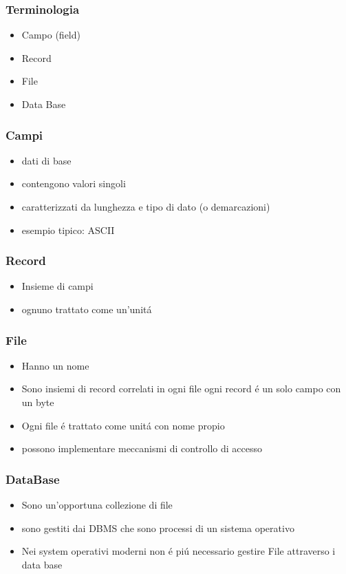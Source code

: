 \subsubsection*{Terminologia}
\begin{itemize}
    \item Campo (field)
    \item Record
    \item File
    \item Data Base
\end{itemize}
\subsubsection*{Campi}
\begin{itemize}
    \item dati di base
    \item contengono valori singoli
    \item caratterizzati da lunghezza e tipo di dato (o demarcazioni)
    \item esempio tipico: ASCII
\end{itemize}
\subsubsection*{Record}
\begin{itemize}
    \item Insieme di campi
    \item ognuno trattato come un'unitá
\end{itemize}
\subsubsection*{File}
\begin{itemize}
    \item Hanno un nome
    \item Sono insiemi di record correlati in ogni file ogni record é un solo campo con un byte
    \item Ogni file é trattato come unitá con nome propio
    \item possono implementare meccanismi di controllo di accesso
\end{itemize}
\subsubsection*{DataBase}
\begin{itemize}
    \item Sono un'opportuna collezione di file
    \item sono gestiti dai DBMS che sono processi di un sistema operativo
    \item Nei system operativi moderni non é piú necessario gestire File attraverso i data base
\end{itemize}

